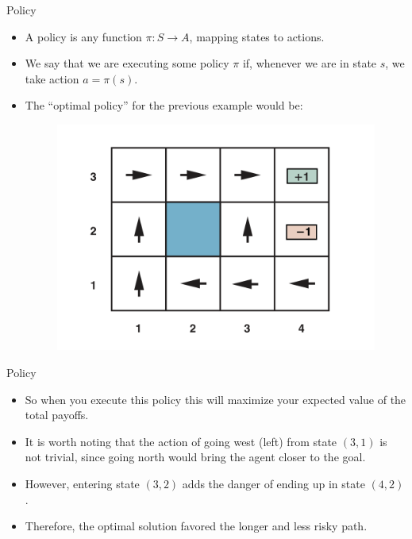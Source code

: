\documentclass[handout]{beamer}
\begin{document}
\begin{frame}{Policy}
\scriptsize
\begin{itemize}
    \item A policy is any function \( \pi : S \to A \), mapping states to actions.
    \item We say that we are executing some policy \( \pi \) if, whenever we are in state \( s \), we take action \( a = \pi(s) \).
  \item The ``optimal policy'' for the previous example would be:

  \begin{figure}[h]
        	\includegraphics[scale = 0.6]{pics/example2.png}
        \end{figure}
      
  \end{itemize}
\end{frame}

\begin{frame}{Policy}
\scriptsize
\begin{itemize}
\item So when you execute this policy this will maximize your expected value of the total payoffs.

\item It is worth noting that the action of going west (left) from state $(3,1)$ is not trivial, since going north would bring the agent closer to the goal.
\item However, entering state $(3,2)$ adds the danger of ending up in state $(4,2)$.
\item Therefore, the optimal solution favored the longer and less risky path. 

\end{itemize}


\end{frame}
\end{document}
